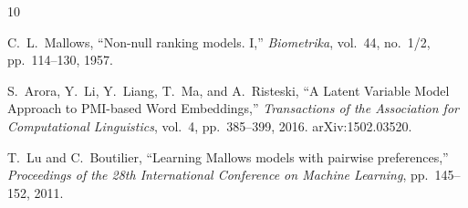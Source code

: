 \documentclass[11pt]{article}
\begin{document}
\begin{thebibliography}{10}

C.~L.~Mallows,
``Non-null ranking models. I,''
\emph{Biometrika}, vol.~44, no.~1/2, pp.~114--130, 1957.

S.~Arora, Y.~Li, Y.~Liang, T.~Ma, and A.~Risteski,
``A Latent Variable Model Approach to PMI-based Word Embeddings,''
\emph{Transactions of the Association for Computational Linguistics}, vol.~4, pp.~385--399, 2016.
arXiv:1502.03520.

T.~Lu and C.~Boutilier,
``Learning Mallows models with pairwise preferences,''
\emph{Proceedings of the 28th International Conference on Machine Learning}, pp.~145--152, 2011.

\end{thebibliography}
\end{document}
